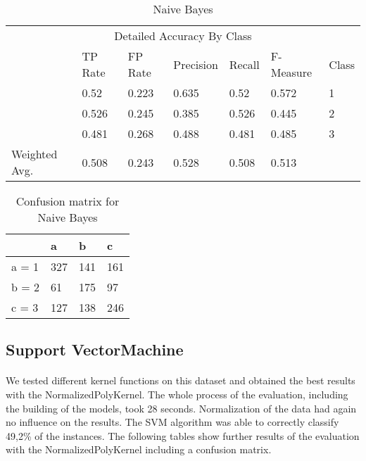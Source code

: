 \documentclass[paper=a4, fontsize=11pt]{scrartcl} %
\numberwithin{equation}{section} %
\numberwithin{figure}{section} %
\numberwithin{table}{section} %
\begin{document}
\begin{table*}[htb]\centering
  \begin{tabular*}{\columnwidth}{@{}lllllll@{}}
      \toprule 
      \multicolumn{7}{c}{Detailed Accuracy By Class} \\ 
               &  TP Rate & FP Rate & Precision & Recall & F-Measure & Class \\   \midrule
               &  0.52    & 0.223   & 0.635     & 0.52   & 0.572     & 1  \\   \midrule
               &  0.526   & 0.245   & 0.385     & 0.526  & 0.445     & 2  \\
               &  0.481   & 0.268   & 0.488     & 0.481  & 0.485     & 3  \\
Weighted Avg.  &  0.508   & 0.243   & 0.528     & 0.508  & 0.513     &    \\   \bottomrule
    \end{tabular*}
\caption{Naive Bayes} 
\label{tab:contra:bayes:1d}
\end{table*}



\begin{table}[h]
\centering
\begin{tabular}{|l|lll|}
\hline
              &   a &   b &   c  \\
\hline
 a = 1        & 327 & 141 & 161  \\
 b = 2        &  61 & 175 &  97  \\
 c = 3        & 127 & 138 & 246  \\
\hline
\end{tabular}
\caption{Confusion matrix for Naive Bayes}
\label{tab:contra:bayes:1c}
\end{table}


\subsection{Support VectorMachine}

\paragraph{}We tested different kernel functions on this dataset and obtained the best results with the NormalizedPolyKernel. The whole process of the evaluation, including the building of the models, took 28 seconds. Normalization of the data had again no influence on the results. The SVM algorithm was able to correctly classify 49,2\% of the instances. The following tables show further results of the evaluation with the NormalizedPolyKernel including a confusion matrix.
\end{document}
